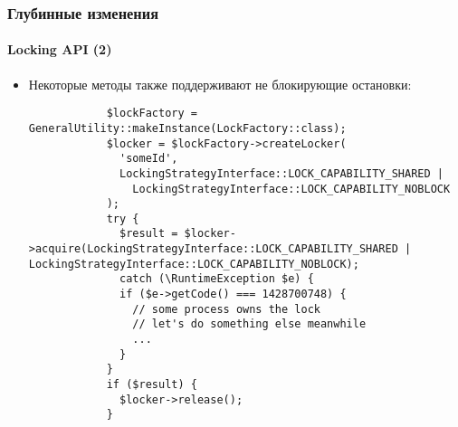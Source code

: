 \begin{frame}[fragile]
	\frametitle{Глубинные изменения}
	\framesubtitle{Locking API (2)}

	\lstset{basicstyle=\tiny\ttfamily}

	\begin{itemize}

		\item Некоторые методы также поддерживают не блокирующие остановки:

		\begin{lstlisting}
			$lockFactory = GeneralUtility::makeInstance(LockFactory::class);
			$locker = $lockFactory->createLocker(
			  'someId',
			  LockingStrategyInterface::LOCK_CAPABILITY_SHARED |
			    LockingStrategyInterface::LOCK_CAPABILITY_NOBLOCK
			);
			try {
			  $result = $locker->acquire(LockingStrategyInterface::LOCK_CAPABILITY_SHARED | LockingStrategyInterface::LOCK_CAPABILITY_NOBLOCK);
			  catch (\RuntimeException $e) {
			  if ($e->getCode() === 1428700748) {
			    // some process owns the lock
			    // let's do something else meanwhile
			    ...
			  }
			}
			if ($result) {
			  $locker->release();
			}
		\end{lstlisting}

	\end{itemize}

\end{frame}

